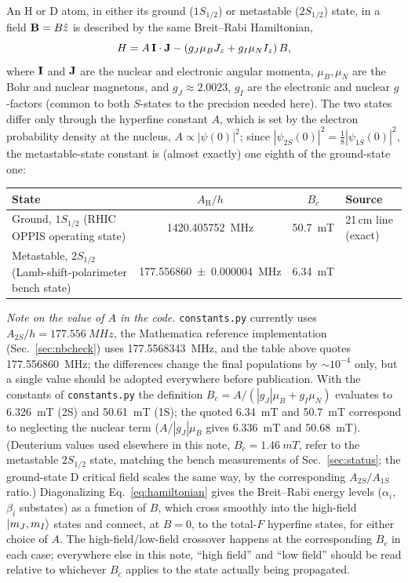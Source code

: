 \documentclass[11pt,a4paper]{article}
\begin{document}
An H or D atom, in either its ground ($1S_{1/2}$) or metastable
($2S_{1/2}$) state, in a field $\vb{B}=B\hat{z}$ is described by the same
Breit--Rabi Hamiltonian,
\begin{equation}
    H = A\, \vb{I}\cdot\vb{J} - \left(g_J \mu_B J_z + g_I \mu_N I_z\right) B ,
    \label{eq:hamiltonian}
\end{equation}
where $\vb{I}$ and $\vb{J}$ are the nuclear and electronic angular momenta,
$\mu_B,\mu_N$ are the Bohr and nuclear magnetons, and $g_J\approx2.0023$,
$g_I$ are the electronic and nuclear $g$-factors (common to both $S$-states
to the precision needed here). The two states differ only through the
hyperfine constant $A$, which is set by the electron probability density at
the nucleus, $A\propto|\psi(0)|^2$; since $|\psi_{2S}(0)|^2 =
\tfrac18|\psi_{1S}(0)|^2$, the metastable-state constant is (almost exactly)
one eighth of the ground-state one:
\begin{center}
\begin{tabular}{@{}lccl@{}}
\toprule
State & $A_{\mathrm H}/h$ & $B_c$ & Source \\
\midrule
Ground, $1S_{1/2}$ (RHIC OPPIS operating state)
    & \SI{1420.405752}{MHz} & \SI{50.7}{mT} & 21\,cm line (exact) \\
Metastable, $2S_{1/2}$ (Lamb-shift-polarimeter bench state)
    & \SI{177.556860(4)}{MHz} & \SI{6.34}{mT} & \cite{kolachevsky2009} \\
\bottomrule
\end{tabular}
\label{tab:groundvsmeta}
\end{center}
\emph{Note on the value of $A$ in the code.} \texttt{constants.py} currently
uses $A_{2S}/h=\SI{177.556}{MHz}$, the Mathematica reference implementation
(Sec.~\ref{sec:nbcheck}) uses \SI{177.5568343}{MHz}, and the table above quotes
\SI{177.556860}{MHz}; the differences change the final populations by
$\sim10^{-4}$ only, but a single value should be adopted everywhere before
publication. With the constants of \texttt{constants.py} the definition
$B_c=A/(|g_J|\mu_B+g_I\mu_N)$ evaluates to \SI{6.326}{mT} (2S) and
\SI{50.61}{mT} (1S); the quoted \SI{6.34}{mT} and \SI{50.7}{mT} correspond to
neglecting the nuclear term ($A/|g_J|\mu_B$ gives \SI{6.336}{mT} and \SI{50.68}{mT}).
(Deuterium values used elsewhere in this note, $B_c=\SI{1.46}{mT}$, refer to
the metastable $2S_{1/2}$ state, matching the bench measurements of
Sec.~\ref{sec:status}; the ground-state D critical field scales the same
way, by the corresponding $A_{2S}/A_{1S}$ ratio.) Diagonalizing
Eq.~\eqref{eq:hamiltonian} gives the Breit--Rabi energy levels ($\alpha_i$,
$\beta_i$ substates) as a function of $B$, which cross smoothly into the
high-field $\ket{m_J,m_I}$ states and connect, at $B=0$, to the total-$F$
hyperfine states, for either choice of $A$. The high-field/low-field
crossover happens at the corresponding $B_c$ in each case; everywhere else
in this note, ``high field'' and ``low field'' should be read relative to
whichever $B_c$ applies to the state actually being propagated.
\end{document}
